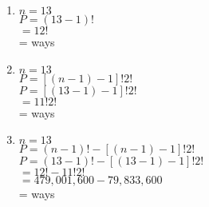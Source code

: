 \begin{enumerate}[label = \arabic*. ]
\begin{enumerate}[label = \alph*. ]
\item %
$ n= 13$ \redcheck \\
$ P = (13-1)! $ \redcheck \\
$ =12! $ \redcheck \\
= \redcheck 
ways \redcheck 

\item %
$ n= 13$ \redcheck \\
$ P = [(n-1)-1]!2! $ \redcheck \\
$ P = [(13-1)-1]!2! $ \redcheck \\
$ = 11!2! $ \redcheck \\
= \redcheck 
ways \redcheck 

\item %
$ n=13 $ \redcheck \\
$ P = (n-1)! - [(n-1)-1]!2! $ \redcheck \\
$ P = (13-1)! - [(13-1)-1]!2! $ \redcheck \\
$ = 12!- 11!2!$ \redcheck \\
$ = 479,001,600- 79,833,600$ \redcheck \\
= \redcheck 
ways \redcheck 

\end{enumerate}   

 

\end{enumerate} 



 

